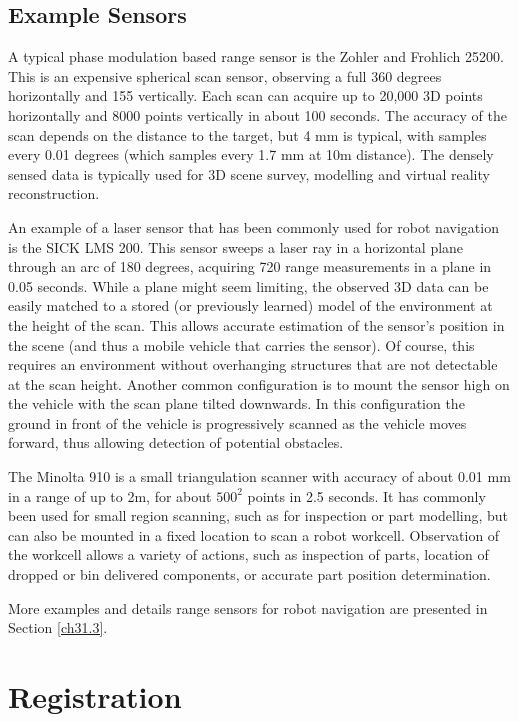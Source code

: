 \documentclass[twocolumn,oneside]{book}
\begin{document}
\subsection{Example Sensors}

A typical phase modulation based range sensor is the Zohler and Frohlich 25200.
This is an expensive spherical scan sensor, observing a full 360 degrees
horizontally and 155 vertically. Each scan can acquire up to 20,000 3D points
horizontally and 8000 points vertically in about 100 seconds.
The accuracy of the scan depends on the distance to the target, but
4 mm is typical, with samples every 0.01 degrees (which samples every
1.7 mm at 10m distance).
The densely sensed data is typically used for 3D scene survey, modelling and
virtual reality reconstruction.

An example of a laser sensor that has been commonly used for robot navigation
is the SICK LMS 200.
This sensor sweeps a laser ray in a horizontal plane through an arc of 180
degrees, acquiring 720 range measurements in a plane in 0.05 seconds.
While a plane might seem limiting, the observed 3D data can be easily matched
to a stored (or previously learned) model of the environment at the
height of the scan.
This allows accurate estimation of the sensor's position in the scene
(and thus a mobile vehicle that carries the sensor).
Of course, this requires an environment without overhanging structures
that are not detectable at the scan height.
Another common configuration is to mount the sensor high on the vehicle 
with the scan plane tilted downwards. In this configuration the ground
in front of the vehicle is progressively scanned as the vehicle moves forward,
thus allowing detection of potential obstacles.

The Minolta 910 is a small triangulation scanner with accuracy of about 0.01 mm
in a range of up to 2m, for about $500^2$ points in 2.5 seconds.
It has commonly been used for small region scanning, such as for inspection
or part modelling, but can also be mounted in a fixed location to scan
a robot workcell. 
Observation of the workcell allows a variety of actions, such as
inspection of parts, location of dropped or bin delivered components,
or accurate part position determination.

More examples and details range sensors for robot navigation are presented
in Section \ref{ch31.3}.

\section{Registration \label{ch31.2}}
\end{document}
